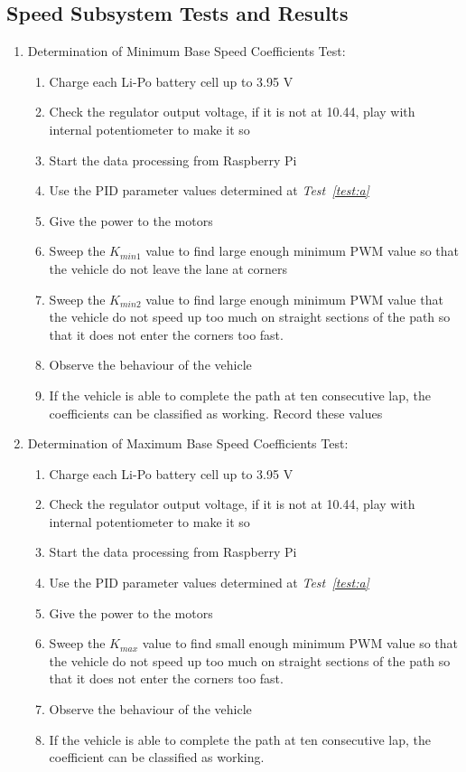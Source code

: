 \documentclass[a4paper,12pt]{article}
\begin{document}
\subsection {Speed Subsystem Tests and Results}
\begin{enumerate}
	
	
	\item Determination of Minimum Base Speed Coefficients Test: \label{test:a2}		
	\begin{enumerate}
		\item Charge each Li-Po battery cell  up to 3.95 V
		\item Check the regulator output voltage, if it is not at 10.44, play with internal potentiometer to make it so  
		\item Start the data processing from Raspberry Pi
		\item Use the PID parameter values determined at \textit{Test~\ref{test:a}}
		\item Give the power to the motors  
		\item Sweep the $K_{min1}$ value to find large enough minimum PWM value so that the vehicle do not leave the lane at corners
		\item Sweep the $K_{min2}$ value to find large enough minimum PWM value that the vehicle do not speed up too much on straight sections of the path so that it does not enter the corners too fast.
		\item Observe the behaviour of the vehicle  
		\item If the vehicle is able to complete the path at ten consecutive lap, the coefficients can be classified as working. Record these values  
	\end{enumerate}
	
	\item Determination of Maximum Base Speed Coefficients Test: \label{test:a2}		
	\begin{enumerate}
		\item Charge each Li-Po battery cell  up to 3.95 V
		\item Check the regulator output voltage, if it is not at 10.44, play with internal potentiometer to make it so  
		\item Start the data processing from Raspberry Pi
		\item Use the PID parameter values determined at \textit{Test~\ref{test:a}}
		\item Give the power to the motors  
		\item Sweep the $K_{max}$ value to find small enough minimum PWM value so that the vehicle do not speed up too much on straight sections of the path so that it does not enter the corners too fast.
		\item Observe the behaviour of the vehicle  
		\item If the vehicle is able to complete the path at ten consecutive lap, the coefficient can be classified as working.  
	\end{enumerate}
	

\end{enumerate}
\end{document}
